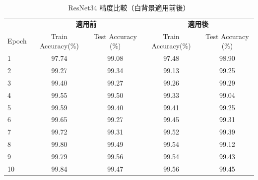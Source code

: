 \documentclass[a4paper,11pt,titlepage]{jsarticle}
\begin{document}
\begin{table}[H]
\centering
\caption{ResNet34 精度比較（白背景適用前後）}
\label{tab:comparison_resnet34}
\begin{tabular}{l|cc|cc}
\hline
      & \multicolumn{2}{c|}{\textbf{適用前 }} & \multicolumn{2}{c}{\textbf{適用後 }} \\ \cline{2-5} 
Epoch & Train Accuracy(\%) & Test Accuracy (\%) & Train Accuracy(\%) & Test Accuracy (\%) \\
\hline
1     & 97.74           & 99.08                & 97.48           & 98.90                \\
2     & 99.27           & 99.34                & 99.13           & 99.25                \\
3     & 99.40           & 99.27                & 99.26           & 99.29                \\
4     & 99.55           & 99.50                & 99.33           & 99.04                \\
5     & 99.59           & 99.40                & 99.41           & 99.25                \\
6     & 99.65           & 99.27                & 99.45           & 99.31                \\
7     & 99.72           & 99.31                & 99.52           & 99.39                \\
8     & 99.80           & 99.49                & 99.54           & 99.12                \\
9     & 99.79           & 99.56                & 99.54           & 99.43                \\
10    & 99.84           & 99.47                & 99.56           & 99.45                \\
\hline
\end{tabular}
\end{table}
\end{document}
